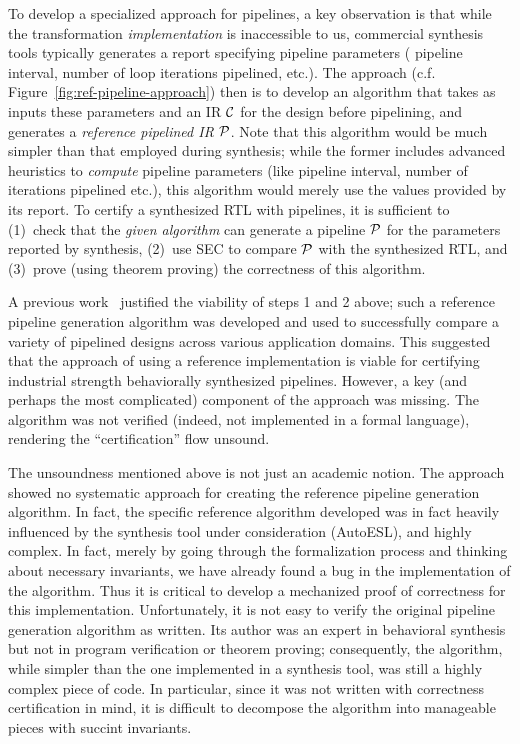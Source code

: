 To develop a specialized approach for pipelines, a key observation
is that while the transformation {\em implementation} is inaccessible
to us, commercial synthesis tools typically generates a report
specifying pipeline parameters (%
pipeline interval, number of loop
iterations pipelined, etc.).  The approach (c.f. Figure~\ref{fig:ref-pipeline-approach})
then is to develop an
algorithm that takes as inputs these parameters and an IR ${\cal{C}}$
for the design before pipelining, and generates a {\em reference
  pipelined IR} ${\cal{P}}$.  Note that this algorithm would be much simpler
than that employed during synthesis; while the former includes
advanced heuristics to {\em compute} pipeline parameters (like
pipeline interval, number of iterations pipelined etc.), this algorithm would merely use
the values provided by its report.  To certify a synthesized RTL with
pipelines, it is sufficient to (1)~check that the {\em given algorithm} can
generate a pipeline ${\cal{P}}$ for the parameters reported by
synthesis, (2)~use SEC to compare ${\cal{P}}$ with the synthesized
RTL, and (3)~prove (using theorem proving) the correctness of this
algorithm.

A previous work~\cite{hrx:dac-12} justified the viability of
steps 1 and 2 above; such a reference pipeline generation algorithm
was developed and used to successfully compare a variety of pipelined
designs across various application domains.  This suggested that the
approach of using a reference implementation is viable for certifying
industrial strength behaviorally synthesized pipelines.  However, a key (and perhaps the
most complicated) component of the approach was missing.  The
algorithm was not verified (indeed, not implemented in a formal
language), rendering the ``certification'' flow unsound.

The unsoundness mentioned above is not just an academic notion.  
The approach showed no systematic approach for
creating the reference pipeline generation algorithm.  In
fact, the specific reference algorithm developed was in fact
heavily influenced by the synthesis tool under consideration
(AutoESL), and highly complex. In
fact, merely by going through the formalization process and thinking
about necessary invariants, we have already found a bug in
the implementation of the algorithm.  
Thus it is critical to develop a mechanized proof of
correctness for this implementation.  Unfortunately, it is not easy to
verify the original pipeline generation algorithm as written.  Its
author was an expert in behavioral synthesis but not in program
verification or theorem proving; consequently, the algorithm, while
simpler than the one implemented in a synthesis tool, was still a highly
complex piece of code.  In particular, since it was not written with
correctness certification in mind, it is difficult to decompose the algorithm into
manageable pieces with succint invariants.

